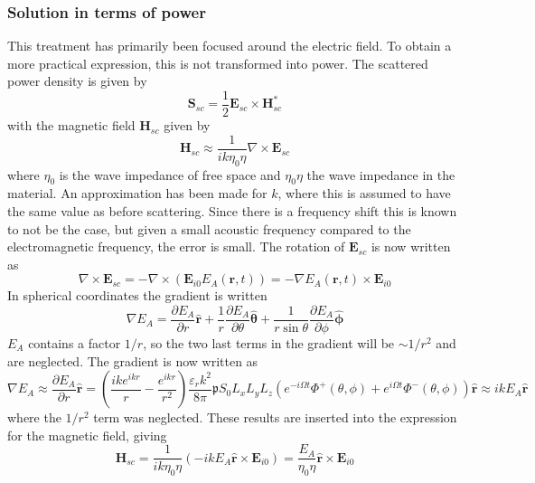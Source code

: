 \documentclass[10pt,a4paper,draft]{scrartcl}
\begin{document}
	\subsubsection{Solution in terms of power}
	This treatment has primarily been focused around the electric field. To obtain a more practical expression, this is not transformed into power. The scattered power density is given by
	\begin{equation*}
		\bm{S}_{sc} = \frac{1}{2} \bm{E}_{sc} \times \bm{H}_{sc}^*
	\end{equation*}
	with the magnetic field $\bm{H}_{sc}$ given by
	\begin{equation*}
		\bm{H}_{sc} \approx \frac{1}{ik \eta_0 \eta} \nabla \times \bm{E}_{sc}
	\end{equation*}
	where $\eta_0$ is the wave impedance of free space and $\eta_0 \eta$ the wave impedance in the material. An approximation has been made for $k$, where this is assumed to have the same value as before scattering. Since there is a frequency shift this is known to not be the case, but given a small acoustic frequency compared to the electromagnetic frequency, the error is small. The rotation of $\bm{E}_{sc}$ is now written as
	\begin{equation*}
		\nabla \times \bm{E}_{sc} = -\nabla \times (\bm{E}_{i0} E_A (\bm{r},t)) = -\nabla E_A (\bm{r},t) \times \bm{E}_{i0}
	\end{equation*}
	In spherical coordinates the gradient is written
	\begin{equation*}
		\nabla E_A = \frac{\partial E_A}{\partial r} \bm{\hat{r}} + \frac{1}{r} \frac{\partial E_A}{\partial \theta} \bm{\hat{\theta}} + \frac{1}{r\sin{\theta}} \frac{\partial E_A}{\partial \phi} \bm{\hat{\phi}}
	\end{equation*}
	$E_A$ contains a factor $1/r$, so the two last terms in the gradient will be $\sim 1/r^2$ and are neglected. The gradient is now written as
	\begin{equation*}
		\nabla E_A \approx \frac{\partial E_A}{\partial r} \bm{\hat{r}} = \left( \frac{ike^{ikr}}{r} - \frac{e^{ikr}}{r^2} \right) \frac{\varepsilon_r k^2}{8\pi} \mathfrak{p} S_0 L_x L_y L_z \left( e^{- i\Omega t} \Phi^+ (\theta,\phi) + e^{ i\Omega t} \Phi^- (\theta,\phi) \right) \bm{\hat{r}} \approx ikE_A \bm{\hat{r}}
	\end{equation*}
	where the $1/r^2$ term was neglected. These results are inserted into the expression for the magnetic field, giving
	\begin{equation*}
		\bm{H}_{sc} = \frac{1}{ik \eta_0 \eta} (-ikE_A \bm{\hat{r}} \times \bm{E}_{i0}) = \frac{E_A}{ \eta_0 \eta} \bm{\hat{r}} \times \bm{E}_{i0}
	\end{equation*}
\end{document}
